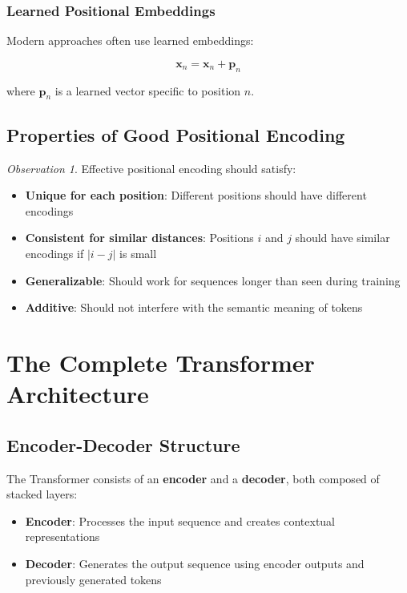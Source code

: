 \documentclass[11pt,a4paper]{article}
\theoremstyle{definition}
\theoremstyle{plain}
\theoremstyle{remark}
\newtheorem*{observation}{Observation}
\begin{document}
\subsubsection{Learned Positional Embeddings}

Modern approaches often use learned embeddings:

\[
\mathbf{x}_n = \mathbf{x}_n + \mathbf{p}_n
\]

where $\mathbf{p}_n$ is a learned vector specific to position $n$.

\subsection{Properties of Good Positional Encoding}

\begin{observation}
Effective positional encoding should satisfy:
\begin{itemize}
    \item \textbf{Unique for each position}: Different positions should have different encodings
    \item \textbf{Consistent for similar distances}: Positions $i$ and $j$ should have similar encodings if $|i-j|$ is small
    \item \textbf{Generalizable}: Should work for sequences longer than seen during training
    \item \textbf{Additive}: Should not interfere with the semantic meaning of tokens
\end{itemize}
\end{observation}

\section{The Complete Transformer Architecture}

\subsection{Encoder-Decoder Structure}

\begin{tcolorbox}[colback=blue!10!white,colframe=blue!75!black,title=\textbf{Transformer Architecture}]
The Transformer consists of an \textbf{encoder} and a \textbf{decoder}, both composed of stacked layers:

\begin{itemize}
    \item \textbf{Encoder}: Processes the input sequence and creates contextual representations
    \item \textbf{Decoder}: Generates the output sequence using encoder outputs and previously generated tokens
\end{itemize}
\end{tcolorbox}
\end{document}
